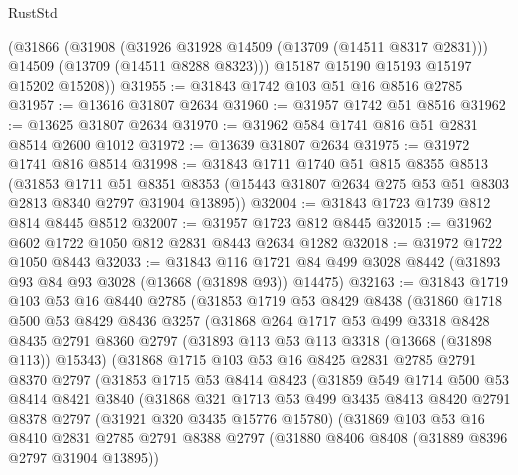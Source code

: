 \begin{lexlean}{RustStd}
\begin{coremodule}
      (@31866
        (@31908
          (@31926 @31928 @14509 (@13709 (@14511 @8317 @2831)))
          @14509
          (@13709 (@14511 @8288 @8323)))
        @15187
        @15190
        @15193
        @15197
        @15202
        @15208))
@31955 := @31843 @1742 @103 @51 @16 @8516 @2785
@31957 := @13616 @31807 @2634
@31960 := @31957 @1742 @51 @8516
@31962 := @13625 @31807 @2634
@31970 := @31962 @584 @1741 @816 @51 @2831 @8514 @2600 @1012
@31972 := @13639 @31807 @2634
@31975 := @31972 @1741 @816 @8514
@31998 := @31843
    @1711
    @1740
    @51
    @815
    @8355
    @8513
    (@31853
      @1711
      @51
      @8351
      @8353
      (@15443 @31807 @2634 @275 @53 @51 @8303 @2813 @8340 @2797 @31904 @13895))
@32004 := @31843 @1723 @1739 @812 @814 @8445 @8512
@32007 := @31957 @1723 @812 @8445
@32015 := @31962 @602 @1722 @1050 @812 @2831 @8443 @2634 @1282
@32018 := @31972 @1722 @1050 @8443
@32033 := @31843
    @116
    @1721
    @84
    @499
    @3028
    @8442
    (@31893 @93 @84 @93 @3028 (@13668 (@31898 @93)) @14475)
@32163 := @31843
    @1719
    @103
    @53
    @16
    @8440
    @2785
    (@31853
      @1719
      @53
      @8429
      @8438
      (@31860
        @1718
        @500
        @53
        @8429
        @8436
        @3257
        (@31868
          @264
          @1717
          @53
          @499
          @3318
          @8428
          @8435
          @2791
          @8360
          @2797
          (@31893 @113 @53 @113 @3318 (@13668 (@31898 @113)) @15343)
          (@31868
            @1715
            @103
            @53
            @16
            @8425
            @2831
            @2785
            @2791
            @8370
            @2797
            (@31853
              @1715
              @53
              @8414
              @8423
              (@31859
                @549
                @1714
                @500
                @53
                @8414
                @8421
                @3840
                (@31868
                  @321
                  @1713
                  @53
                  @499
                  @3435
                  @8413
                  @8420
                  @2791
                  @8378
                  @2797
                  (@31921 @320 @3435 @15776 @15780)
                  (@31869
                    @103
                    @53
                    @16
                    @8410
                    @2831
                    @2785
                    @2791
                    @8388
                    @2797
                    (@31880 @8406 @8408 (@31889 @8396 @2797 @31904 @13895))

\end{coremodule}
\end{lexlean}
